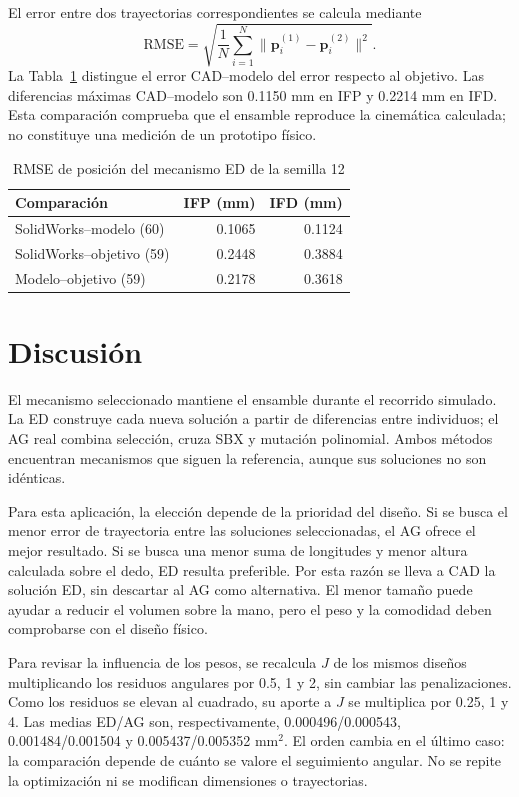 \documentclass[conference,letterpaper]{IEEEtran}
\begin{document}
El error entre dos trayectorias correspondientes se calcula mediante
\begin{equation}
\mathrm{RMSE}=\sqrt{\frac{1}{N}\sum_{i=1}^{N}\|\mathbf p_i^{(1)}-\mathbf p_i^{(2)}\|^2}.
\end{equation}
La Tabla~\ref{tab:simulacion} distingue el error CAD--modelo del error respecto al objetivo. Las diferencias máximas CAD--modelo son 0.1150 mm en IFP y 0.2214 mm en IFD. Esta comparación comprueba que el ensamble reproduce la cinemática calculada; no constituye una medición de un prototipo físico.

\begin{table}[t]
\caption{RMSE de posición del mecanismo ED de la semilla 12}
\label{tab:simulacion}\centering\footnotesize
\begin{tabular}{lrr}\toprule Comparación & IFP (mm) & IFD (mm)\\\midrule
SolidWorks--modelo (60)&0.1065&0.1124\\
SolidWorks--objetivo (59)&0.2448&0.3884\\
Modelo--objetivo (59)&0.2178&0.3618\\\bottomrule
\end{tabular}
\end{table}

\section{Discusión}
El mecanismo seleccionado mantiene el ensamble durante el recorrido simulado. La ED construye cada nueva solución a partir de diferencias entre individuos; el AG real combina selección, cruza SBX y mutación polinomial. Ambos métodos encuentran mecanismos que siguen la referencia, aunque sus soluciones no son idénticas.

Para esta aplicación, la elección depende de la prioridad del diseño. Si se busca el menor error de trayectoria entre las soluciones seleccionadas, el AG ofrece el mejor resultado. Si se busca una menor suma de longitudes y menor altura calculada sobre el dedo, ED resulta preferible. Por esta razón se lleva a CAD la solución ED, sin descartar al AG como alternativa. El menor tamaño puede ayudar a reducir el volumen sobre la mano, pero el peso y la comodidad deben comprobarse con el diseño físico.

Para revisar la influencia de los pesos, se recalcula $J$ de los mismos diseños multiplicando los residuos angulares por 0.5, 1 y 2, sin cambiar las penalizaciones. Como los residuos se elevan al cuadrado, su aporte a $J$ se multiplica por 0.25, 1 y 4. Las medias ED/AG son, respectivamente, 0.000496/0.000543, 0.001484/0.001504 y 0.005437/0.005352 mm$^2$. El orden cambia en el último caso: la comparación depende de cuánto se valore el seguimiento angular. No se repite la optimización ni se modifican dimensiones o trayectorias.
\end{document}
